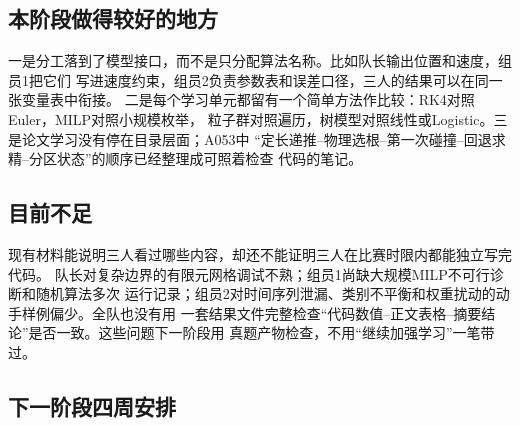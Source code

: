 \documentclass[UTF8,zihao=-4]{ctexart}
\begin{document}
\subsection{本阶段做得较好的地方}

一是分工落到了模型接口，而不是只分配算法名称。比如队长输出位置和速度，组员1把它们
写进速度约束，组员2负责参数表和误差口径，三人的结果可以在同一张变量表中衔接。
二是每个学习单元都留有一个简单方法作比较：RK4对照Euler，MILP对照小规模枚举，
粒子群对照遍历，树模型对照线性或Logistic。三是论文学习没有停在目录层面；A053中
“定长递推--物理选根--第一次碰撞--回退求精--分区状态”的顺序已经整理成可照着检查
代码的笔记。

\subsection{目前不足}

现有材料能说明三人看过哪些内容，却还不能证明三人在比赛时限内都能独立写完代码。
队长对复杂边界的有限元网格调试不熟；组员1尚缺大规模MILP不可行诊断和随机算法多次
运行记录；组员2对时间序列泄漏、类别不平衡和权重扰动的动手样例偏少。全队也没有用
一套结果文件完整检查“代码数值--正文表格--摘要结论”是否一致。这些问题下一阶段用
真题产物检查，不用“继续加强学习”一笔带过。

\subsection{下一阶段四周安排}
\end{document}
